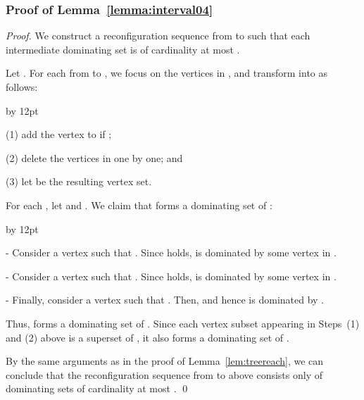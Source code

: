 \documentclass{llncs}
\newenvironment{listing}[1]{\begin{list}{*}{\settowidth{\labelwidth}{#1}\setlength{\leftmargin}{\labelwidth}\advance \leftmargin by 12pt
\setlength{\itemsep}{0pt}\setlength{\parsep}{0pt}\setlength{\topsep}{0pt}\setlength{\parskip}{0pt}}}{\end{list}}
\begin{document}
\subsubsection{Proof of Lemma~\ref{lemma:interval04}}
\begin{proof}
We construct a reconfiguration sequence from  to  such that
each intermediate dominating set is of cardinality at most .

Let .
For each  from  to , we focus on the vertices in , and transform  into  as follows:
\begin{listing}{aaa}
	\item[(1)] add the vertex  to  if ;
	\item[(2)] delete the vertices in  one by one; and
	\item[(3)] let  be the resulting vertex set.
\end{listing}
\smallskip
	
For each , let 
and .
We claim that  forms a dominating set of :
\begin{listing}{a}
	\item[-] Consider a vertex  such that .
				Since  holds,  is dominated by some vertex in .
	\item[-] Consider a vertex  such that .
				Since  holds,  is dominated by some vertex in .
	\item[-] Finally, consider a vertex  such that .
				Then,  and hence  is dominated by .
\end{listing}
Thus,  forms a dominating set of .
Since each vertex subset appearing in Steps~(1) and (2) above is a superset of , it also forms a dominating set of .

By the same arguments as in the proof of Lemma~\ref{lem:treereach}, we can conclude
that the reconfiguration sequence from  to  above consists
only of dominating sets of cardinality at most .
\qed
\end{proof}
\end{document}
